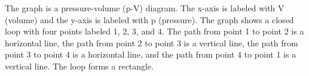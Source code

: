 The graph is a pressure-volume (p-V) diagram. The x-axis is labeled with V (volume) and the y-axis is labeled with p (pressure). The graph shows a closed loop with four points labeled 1, 2, 3, and 4. The path from point 1 to point 2 is a horizontal line, the path from point 2 to point 3 is a vertical line, the path from point 3 to point 4 is a horizontal line, and the path from point 4 to point 1 is a vertical line. The loop forms a rectangle.